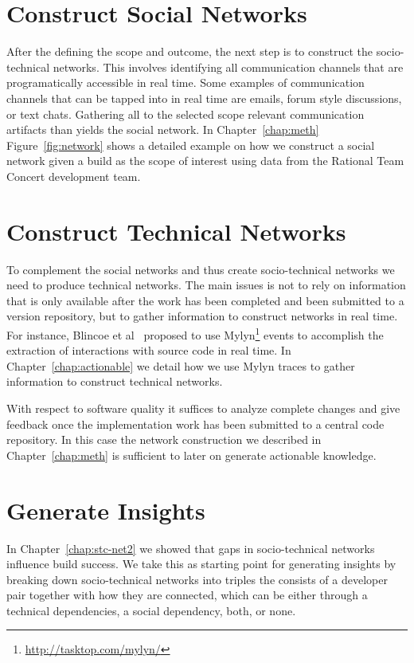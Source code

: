 \section{Construct Social Networks}
After the defining the scope and outcome, the next step is to construct the socio-technical networks.
This involves identifying all communication channels that are programatically accessible in real time.
Some examples of communication channels that can be tapped into in real time are emails, forum style discussions, or text chats.
Gathering all to the selected scope relevant communication artifacts than yields the social network.
In Chapter~\ref{chap:meth} Figure~\ref{fig:network} shows a detailed  example on how we construct a social network given a build as the scope of interest using data from the Rational Team Concert development team.

\section{Construct Technical Networks}
To complement the social networks and thus create socio-technical networks we need to produce technical networks.
The main issues is not to rely on information that is only available after the work has been completed and been submitted to a version repository, but to gather information to construct networks in real time.
For instance, Blincoe et al~\cite{blincoe:cscw:2012} proposed to use Mylyn\footnote{\url{http://tasktop.com/mylyn/}} events to accomplish the extraction of interactions with source code in real time.
In Chapter~\ref{chap:actionable} we detail how we use Mylyn traces to gather information to construct technical networks.

With respect to software quality it suffices to analyze complete changes and give feedback once the implementation work has been submitted to a central code repository.
In this case the network construction we described in Chapter~\ref{chap:meth} is sufficient to later on generate actionable knowledge.

\section{Generate Insights}
In Chapter~\ref{chap:stc-net2} we showed that gaps in socio-technical networks influence build success.
We take this as starting point for generating insights by breaking down socio-technical networks into triples the consists of a developer pair together with how they are connected, which can be either through a technical dependencies, a social dependency, both, or none.

